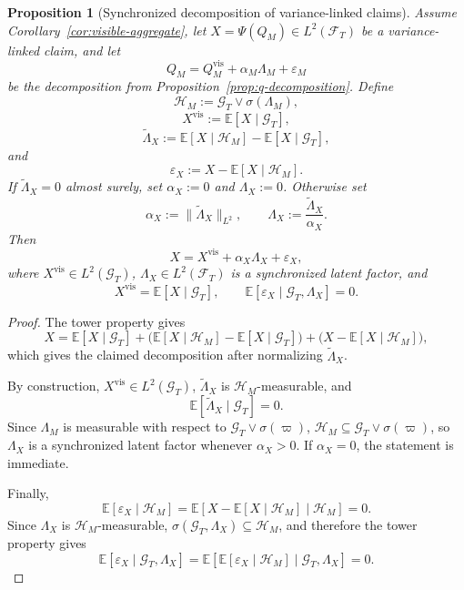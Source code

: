 \documentclass[11pt,a4paper]{amsart}
\theoremstyle{plain}
\newtheorem{proposition}[theorem]{Proposition}
\theoremstyle{definition}
\theoremstyle{remark}
\newcommand{\EE}{\mathbb{E}}
\newcommand{\cH}{\mathcal{H}}
\newcommand{\cF}{\mathcal{F}}
\newcommand{\cG}{\mathcal{G}}
\begin{document}
\begin{proposition}[Synchronized decomposition of variance-linked claims]\label{prop:claim-decomposition}
Assume Corollary~\ref{cor:visible-aggregate}, let \(X=\Psi(Q_M)\in L^2(\cF_T)\) be a
variance-linked claim, and let
\[
        Q_M=Q_M^{\mathrm{vis}}+\alpha_M\Lambda_M+\varepsilon_M
\]
be the decomposition from Proposition~\ref{prop:q-decomposition}.  Define
\[
        \cH_M:=\cG_T\vee \sigma(\Lambda_M),
\]
\[
        X^{\mathrm{vis}}:=\EE[X\mid \cG_T],
\]
\[
        \widetilde\Lambda_X
        :=
        \EE[X\mid \cH_M]
        -
        \EE[X\mid \cG_T],
\]
and
\[
        \varepsilon_X:=X-\EE[X\mid \cH_M].
\]
If \(\widetilde\Lambda_X=0\) almost surely, set \(\alpha_X:=0\) and \(\Lambda_X:=0\).  Otherwise set
\[
        \alpha_X:=\|\widetilde\Lambda_X\|_{L^2},
        \qquad
        \Lambda_X:=\frac{\widetilde\Lambda_X}{\alpha_X}.
\]
Then
\[
        X=X^{\mathrm{vis}}+\alpha_X\Lambda_X+\varepsilon_X,
\]
where \(X^{\mathrm{vis}}\in L^2(\cG_T)\), \(\Lambda_X\in L^2(\cF_T)\) is a synchronized latent
factor, and
\[
        X^{\mathrm{vis}}=\EE[X\mid \cG_T],
        \qquad
        \EE[\varepsilon_X\mid \cG_T,\Lambda_X]=0.
\]
\end{proposition}

\begin{proof}
The tower property gives
\[
        X
        =
        \EE[X\mid \cG_T]
        +
        \bigl(\EE[X\mid \cH_M]-\EE[X\mid \cG_T]\bigr)
        +
        \bigl(X-\EE[X\mid \cH_M]\bigr),
\]
which gives the claimed decomposition after normalizing \(\widetilde\Lambda_X\).

By construction, \(X^{\mathrm{vis}}\in L^2(\cG_T)\), \(\widetilde\Lambda_X\) is
\(\cH_M\)-measurable, and
\[
        \EE[\widetilde\Lambda_X\mid \cG_T]=0.
\]
Since \(\Lambda_M\) is measurable with respect to \(\cG_T\vee \sigma(\varpi)\),
\(\cH_M\subseteq \cG_T\vee \sigma(\varpi)\), so \(\Lambda_X\) is a synchronized latent factor
whenever \(\alpha_X>0\).  If \(\alpha_X=0\), the statement is immediate.

Finally,
\[
        \EE[\varepsilon_X\mid \cH_M]
        =
        \EE[X-\EE[X\mid \cH_M]\mid \cH_M]
        =
        0.
\]
Since \(\Lambda_X\) is \(\cH_M\)-measurable, \(\sigma(\cG_T,\Lambda_X)\subseteq \cH_M\), and
therefore the tower property gives
\[
        \EE[\varepsilon_X\mid \cG_T,\Lambda_X]
        =
        \EE\!\left[\EE[\varepsilon_X\mid \cH_M]\mid \cG_T,\Lambda_X\right]
        =
        0.
\]
\end{proof}
\end{document}
